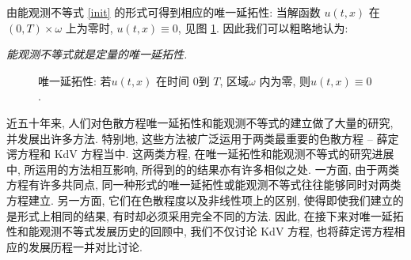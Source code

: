 \documentclass[master]{cugthesis}
\begin{document}
    
    由能观测不等式 \eqref{init} 的形式可得到相应的唯一延拓性: 当解函数 $u(t,x)$ 在 $(0,T)\times \omega$ 上为零时, $u(t,x)\equiv 0$, 见图 \ref{fig2}. 因此我们可以粗略地认为:
    \begin{center}
        \itshape 能观测不等式就是定量的唯一延拓性.
    \end{center}
    \begin{figure}[ht]
    \centering
    \caption{唯一延拓性: 若$u(t,x)$ 在时间 $0$到 $T$, 区域$\omega$ 内为零, 则$u(t,x)\equiv 0$.}
    \label{fig2}
  \end{figure}
    
    近五十年来, 人们对色散方程唯一延拓性和能观测不等式的建立做了大量的研究, 并发展出许多方法. 特别地, 这些方法被广泛运用于两类最重要的色散方程 -- 薛定谔方程和 KdV 方程当中. 这两类方程, 在唯一延拓性和能观测不等式的研究进展中, 所运用的方法相互影响, 所得到的的结果亦有许多相似之处. 一方面, 由于两类方程有许多共同点, 同一种形式的唯一延拓性或能观测不等式往往能够同时对两类方程建立. 另一方面, 它们在色散程度以及非线性项上的区别, 使得即使我们建立的是形式上相同的结果, 有时却必须采用完全不同的方法. 
    因此, 在接下来对唯一延拓性和能观测不等式发展历史的回顾中, 我们不仅讨论 KdV 方程, 也将薛定谔方程相应的发展历程一并对比讨论.
\end{document}
